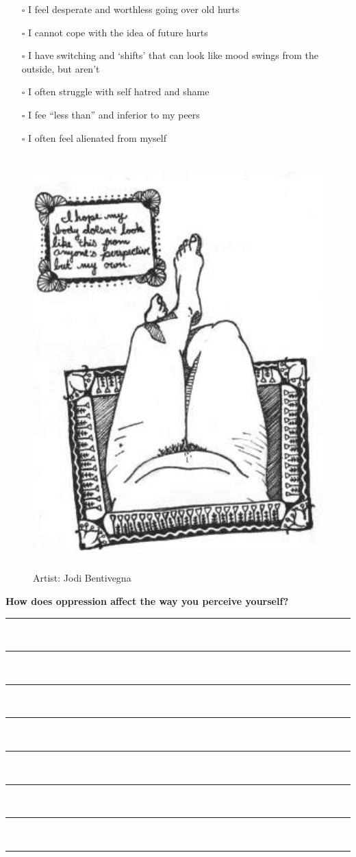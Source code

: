\begin{multicols}{2}
\begin{itemize}
\item[$\square$]{I feel desperate and worthless going over old hurts}
\item[$\square$]{I cannot cope with the idea of future hurts}
\item[$\square$]{I have switching and ‘shifts’ that can look like mood swings from the outside, but aren’t}
\item[$\square$]{I often struggle with self hatred and shame}
\item[$\square$]{I fee “less than” and inferior to my peers}
\item[$\square$]{I often feel alienated from myself}
\end{itemize}
\end{multicols}

\begin{figure}[h]
\centering
\includegraphics[height=16cm]{TeX_files/2-2.png}
\caption{Artist: Jodi Bentivegna}
\label{2-2}
\end{figure}

\newpage
\noindent
\textcolor{ProcessBlue}{\textbf{\Large{How does oppression affect the way you perceive yourself?}}}\\
\noindent\rule{\textwidth}{1pt}\\
\noindent\rule{\textwidth}{1pt}\\
\noindent\rule{\textwidth}{1pt}\\
\noindent\rule{\textwidth}{1pt}\\
\noindent\rule{\textwidth}{1pt}\\
\noindent\rule{\textwidth}{1pt}\\
\noindent\rule{\textwidth}{1pt}\\
\noindent\rule{\textwidth}{1pt}\\\\

